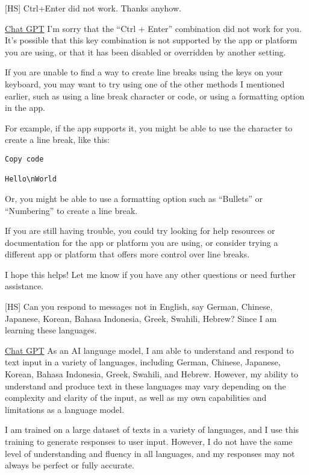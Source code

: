 \documentclass[
]{book}
\theoremstyle{definition}
\theoremstyle{definition}
\theoremstyle{definition}
\theoremstyle{definition}
\theoremstyle{remark}
\begin{document}
{[}HS{]} Ctrl+Enter did not work. Thanks anyhow.

\protect\hyperlink{chatgpt}{Chat GPT} I'm sorry that the ``Ctrl + Enter'' combination did not work for you. It's possible that this key combination is not supported by the app or platform you are using, or that it has been disabled or overridden by another setting.

If you are unable to find a way to create line breaks using the keys on your keyboard, you may want to try using one of the other methods I mentioned earlier, such as using a line break character or code, or using a formatting option in the app.

For example, if the app supports it, you might be able to use the \n character to create a line break, like this:

\begin{verbatim}
Copy code

Hello\nWorld
\end{verbatim}

Or, you might be able to use a formatting option such as ``Bullets'' or ``Numbering'' to create a line break.

If you are still having trouble, you could try looking for help resources or documentation for the app or platform you are using, or consider trying a different app or platform that offers more control over line breaks.

I hope this helps! Let me know if you have any other questions or need further assistance.

{[}HS{]} Can you respond to messages not in English, say German, Chinese, Japanese, Korean, Bahasa Indonesia, Greek, Swahili, Hebrew? Since I am learning these languages.

\protect\hyperlink{chatgpt}{Chat GPT} As an AI language model, I am able to understand and respond to text input in a variety of languages, including German, Chinese, Japanese, Korean, Bahasa Indonesia, Greek, Swahili, and Hebrew. However, my ability to understand and produce text in these languages may vary depending on the complexity and clarity of the input, as well as my own capabilities and limitations as a language model.

I am trained on a large dataset of texts in a variety of languages, and I use this training to generate responses to user input. However, I do not have the same level of understanding and fluency in all languages, and my responses may not always be perfect or fully accurate.
\end{document}
